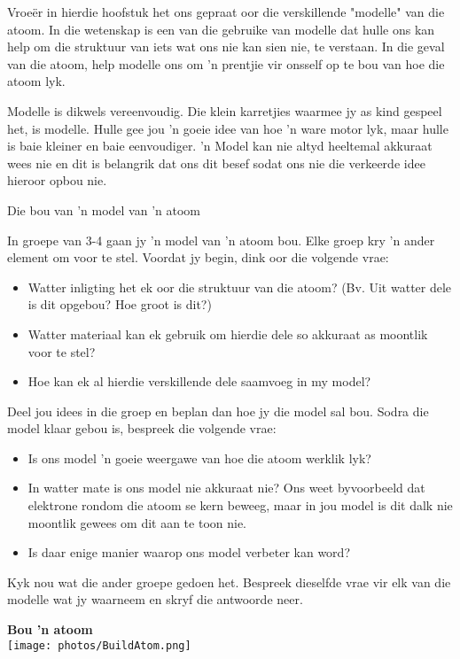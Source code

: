 Vroe\"{e}r in hierdie hoofstuk het ons gepraat oor die verskillende "modelle" van die atoom. In die wetenskap is een van die gebruike van modelle dat hulle ons kan help om die struktuur van iets wat ons nie kan sien nie, te verstaan. In die geval van die atoom, help modelle ons om 'n prentjie vir onsself op te bou van hoe die atoom lyk.\par 

Modelle is dikwels vereenvoudig. Die klein karretjies waarmee jy as kind gespeel het, is modelle. Hulle gee jou 'n goeie idee van hoe 'n ware motor lyk, maar hulle is baie kleiner en baie eenvoudiger. 'n Model kan nie altyd heeltemal akkuraat wees nie en dit is belangrik dat ons dit besef sodat ons nie die verkeerde idee hieroor opbou nie.\par 
\begin{groupdiscussion}{Die bou van 'n model van 'n atoom}
\nopagebreak
\begin{multicols}{2}
In groepe van 3-4 gaan jy 'n model van 'n atoom bou. Elke groep kry 'n ander element om voor te stel. Voordat jy begin, dink oor die volgende vrae:\par 
\begin{itemize}[noitemsep]
\item Watter inligting het ek oor die struktuur van die atoom? (Bv. Uit watter dele is dit opgebou? Hoe groot is dit?)
\item Watter materiaal kan ek gebruik om hierdie dele so akkuraat as moontlik voor te stel?
\item Hoe kan ek al hierdie verskillende dele saamvoeg in my model?
\end{itemize}

Deel jou idees in die groep en beplan dan hoe jy die model sal bou. Sodra die model klaar gebou is, bespreek die volgende vrae:\par 
\begin{itemize}[noitemsep]
\item Is ons model 'n goeie weergawe van hoe die atoom werklik lyk?
\item In watter mate is ons model nie akkuraat nie? Ons weet byvoorbeeld dat elektrone rondom die atoom se kern beweeg, maar in jou model is dit dalk nie moontlik gewees om dit aan te toon nie.
\item Is daar enige manier waarop ons model verbeter kan word?
\end{itemize}

Kyk nou wat die ander groepe gedoen het. Bespreek dieselfde vrae vir elk van die modelle wat jy waarneem en skryf die antwoorde neer. \par 
\end{multicols}
\begin{center}
\textbf{Bou 'n atoom}\\
 \texttt{[image: photos/BuildAtom.png]}
\end{center}

\end{groupdiscussion}   

